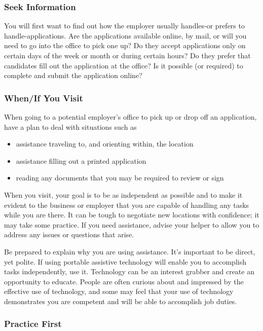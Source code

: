 \subsubsection*{Seek Information}

You will first want to find out how the employer usually handles-or prefers to handle-applications. Are the applications available online, by mail, or will you need to go into the office to pick one up? Do they accept applications only on certain days of the week or month or during certain hours? Do they prefer that candidates fill out the application at the office? Is it possible (or required) to complete and submit the application online?

\subsubsection*{When/If You Visit}

When going to a potential employer's office to pick up or drop off an application, have a plan to deal with situations such as
\begin{itemize}[leftmargin=1.0cm]
	\item assistance traveling to, and orienting within, the location
	\item assistance filling out a printed application
	\item reading any documents that you may be required to review or sign
\end{itemize}

When you visit, your goal is to be as independent as possible and to make it evident to the business or employer that you are capable of handling any tasks while you are there. It can be tough to negotiate new locations with confidence; it may take some practice. If you need assistance, advise your helper to allow you to address any issues or questions that arise.

Be prepared to explain why you are using assistance. It's important to be direct, yet polite. If using portable assistive technology will enable you to accomplish tasks independently, use it. Technology can be an interest grabber and create an opportunity to educate. People are often curious about and impressed by the effective use of technology, and some may feel that your use of technology demonstrates you are competent and will be able to accomplish job duties.

\subsubsection*{Practice First}

